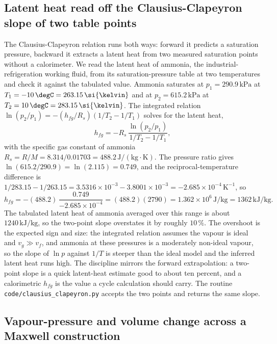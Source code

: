 \subsection{Latent heat read off the Clausius-Clapeyron slope of two
table points}

The Clausius-Clapeyron relation runs both ways: forward it predicts a
saturation pressure, backward it extracts a latent heat from two measured
saturation points without a calorimeter. We read the latent heat of
ammonia, the industrial-refrigeration working fluid, from its
saturation-pressure table at two temperatures and check it against the
tabulated value. Ammonia saturates at $p_1 = 290.9\,\text{kPa}$ at $T_1 =
-10\,\degC = 263.15\,\si{\kelvin}$ and at $p_2 = 615.2\,\text{kPa}$ at
$T_2 = 10\,\degC = 283.15\,\si{\kelvin}$. The integrated relation
$\ln(p_2/p_1) = -(h_{fg}/R_s)(1/T_2 - 1/T_1)$ solves for the latent heat,
\[
h_{fg} = -R_s\,\frac{\ln(p_2/p_1)}{1/T_2 - 1/T_1},
\]
with the specific gas constant of ammonia $R_s = R/M = 8.314/0.01703 =
488.2\,\text{J}/(\text{kg}\cdot\si{\kelvin})$. The pressure ratio gives
$\ln(615.2/290.9) = \ln(2.115) = 0.749$, and the reciprocal-temperature
difference is $1/283.15 - 1/263.15 = 3.5316\times 10^{-3} - 3.8001\times
10^{-3} = -2.685\times 10^{-4}\,\si{\kelvin}^{-1}$, so
\[
h_{fg} = -(488.2)\,\frac{0.749}{-2.685\times 10^{-4}} = (488.2)(2790) =
1.362\times 10^{6}\,\text{J}/\text{kg} = 1362\,\text{kJ}/\text{kg}.
\]
The tabulated latent heat of ammonia averaged over this range is about
$1240\,\text{kJ}/\text{kg}$, so the two-point slope overstates it by roughly
$10\,\%$. The overshoot is the expected sign and size: the integrated
relation assumes the vapour is ideal and $v_g \gg v_f$, and ammonia at these
pressures is a moderately non-ideal vapour, so the slope of $\ln p$ against
$1/T$ is steeper than the ideal model and the inferred latent heat runs
high. The discipline mirrors the forward extrapolation: a two-point slope is
a quick latent-heat estimate good to about ten percent, and a calorimetric
$h_{fg}$ is the value a cycle calculation should carry. The routine
\texttt{code/clausius\_clapeyron.py} accepts the two points and returns the
same slope.

\subsection{Vapour-pressure and volume change across a Maxwell construction}

